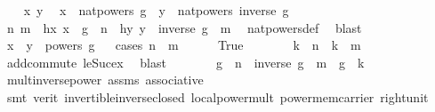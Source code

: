 \begin{isabellebody}
%
\isadelimproof
%
\endisadelimproof
%
\isatagproof
{}\isamarkupfalse%
{\isacharminus}{\kern0pt}\isanewline
\ \ \isamarkupfalse%
\ x\ y\ \isamarkupfalse%
\ {\isachardoublequoteopen}x\ {\isasymin}\ nat{\isacharunderscore}{\kern0pt}powers\ g{\isachardoublequoteclose}\ \ {\isachardoublequoteopen}y\ {\isasymin}\ nat{\isacharunderscore}{\kern0pt}powers\ {\isacharparenleft}{\kern0pt}inverse\ g{\isacharparenright}{\kern0pt}{\isachardoublequoteclose}\isanewline
\ \ \isamarkupfalse%
\ \isamarkupfalse%
\ n\ m\ \ hx{\isacharcolon}{\kern0pt}\ {\isachardoublequoteopen}x\ {\isacharequal}{\kern0pt}\ g\ {\isacharcircum}{\kern0pt}\ n{\isachardoublequoteclose}\ \ hy{\isacharcolon}{\kern0pt}\ {\isachardoublequoteopen}y\ {\isacharequal}{\kern0pt}\ {\isacharparenleft}{\kern0pt}inverse\ g{\isacharparenright}{\kern0pt}\ {\isacharcircum}{\kern0pt}\ m{\isachardoublequoteclose}\ \isamarkupfalse%
\ nat{\isacharunderscore}{\kern0pt}powers{\isacharunderscore}{\kern0pt}def\ \isamarkupfalse%
\ blast\isanewline
\ \ \isamarkupfalse%
\ {\isachardoublequoteopen}x\ {\isasymcdot}\ y\ {\isasymin}\ powers\ g{\isachardoublequoteclose}\isanewline
\ \ \isamarkupfalse%
{\isacharparenleft}{\kern0pt}cases\ {\isachardoublequoteopen}n\ {\isasymge}\ m{\isachardoublequoteclose}{\isacharparenright}{\kern0pt}\isanewline
\ \ \ \ \isamarkupfalse%
\ True\isanewline
\ \ \ \ \isamarkupfalse%
\ \isamarkupfalse%
\ k\ \ {\isachardoublequoteopen}n\ {\isacharequal}{\kern0pt}\ k\ {\isacharplus}{\kern0pt}\ m{\isachardoublequoteclose}\ \isamarkupfalse%
\ add{\isachardot}{\kern0pt}commute\ le{\isacharunderscore}{\kern0pt}Suc{\isacharunderscore}{\kern0pt}ex\ \isamarkupfalse%
\ blast\isanewline
\ \ \ \ \isamarkupfalse%
\ \isamarkupfalse%
\ {\isachardoublequoteopen}g\ {\isacharcircum}{\kern0pt}\ n\ {\isasymcdot}\ {\isacharparenleft}{\kern0pt}inverse\ g{\isacharparenright}{\kern0pt}\ {\isacharcircum}{\kern0pt}\ m\ {\isacharequal}{\kern0pt}\ g\ {\isacharcircum}{\kern0pt}\ k{\isachardoublequoteclose}\ \isamarkupfalse%
\ mult{\isacharunderscore}{\kern0pt}inverse{\isacharunderscore}{\kern0pt}power\ assms\ associative\ \isanewline
\ \ \ \ \ \ \isamarkupfalse%
\ {\isacharparenleft}{\kern0pt}smt\ {\isacharparenleft}{\kern0pt}verit{\isacharparenright}{\kern0pt}\ invertible{\isacharunderscore}{\kern0pt}inverse{\isacharunderscore}{\kern0pt}closed\ local{\isachardot}{\kern0pt}power{\isacharunderscore}{\kern0pt}mult\ power{\isacharunderscore}{\kern0pt}mem{\isacharunderscore}{\kern0pt}carrier\ right{\isacharunderscore}{\kern0pt}unit{\isacharparenright}{\kern0pt}\isanewline

\end{isabellebody}
